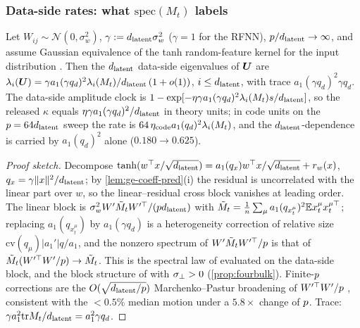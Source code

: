 \subsubsection{Data-side rates: what $\mathrm{spec}(M_t)$ labels}

\begin{proposition}[sketched]\label{prop:data-side-rates-pred}
Let $W_{ij}\sim\mathcal N(0,\sigma_w^2)$, $\gamma:=d_{\mathrm{latent}}\sigma_w^2$ ($\gamma=1$ for the RFNN), $p/d_{\mathrm{latent}}\to\infty$, and assume Gaussian equivalence of the tanh random-feature kernel for the input distribution \citep{pennington2017nonlinear,benigni2021eigenvalue,hu2022universality,goldt2022gaussian}. Then the $d_{\mathrm{latent}}$ data-side eigenvalues of $\bm{U}$ are $\lambda_i(\bm{U})=\gamma a_1(\gamma q_d)^2\lambda_i(M_t)/d_{\mathrm{latent}}\,(1+o(1))$, $i\le d_{\mathrm{latent}}$, with trace $a_1(\gamma q_d)^2\gamma q_d$. The data-side amplitude clock is $1-\exp[-\eta\gamma a_1(\gamma q_d)^2\lambda_i(M_t)s/d_{\mathrm{latent}}]$, so the released $\kappa$ equals $\eta\gamma a_1(\gamma q_d)^2/d_{\mathrm{latent}}$ in theory units; in code units on the $p=64d_{\mathrm{latent}}$ sweep the rate is $64\,\eta_{\rm code}a_1(q_d)^2\lambda_i(M_t)$, and the $d_{\mathrm{latent}}$-dependence is carried by $a_1(q_d)^2$ alone ($0.180\to0.625$).
\end{proposition}
\begin{proof}[Proof sketch]
Decompose $\tanh(w^\top x/\sqrt{d_{\mathrm{latent}}})=a_1(q_x)w^\top x/\sqrt{d_{\mathrm{latent}}}+r_w(x)$, $q_x=\gamma\|x\|^2/d_{\mathrm{latent}}$; by \cref{lem:ge-coeff-pred}(i) the residual is uncorrelated with the linear part over $w$, so the linear--residual cross block vanishes at leading order. The linear block is $\sigma_w^2W'\tilde M_tW'^\top/(pd_{\mathrm{latent}})$ with $\tilde M_t=\frac1{n}\sum_\mu a_1(q_{x_t^\mu})^2\mathbb{E} x_t^\mu x_t^{\mu\top}$; replacing $a_1(q_{x_t^\mu})$ by $a_1(\gamma q_d)$ is a heterogeneity correction of relative size $\mathrm{cv}(q_\mu)|a_1'|q/a_1$, and the nonzero spectrum of $W'\tilde M_tW'^\top/p$ is that of $\tilde M_t(W'^\top W'/p)\to\tilde M_t$. This is the spectral law of \citet{bonnaire2025} evaluated on the data-side block, and the block structure of \citet{george2025dsm} with $\sigma_{\perp}>0$ (\cref{prop:fourbulk}). Finite-$p$ corrections are the $O(\sqrt{d_{\mathrm{latent}}/p})$ Marchenko--Pastur broadening of $W'^\top W'/p$ \citep{marchenko1967distribution}, consistent with the $<0.5\%$ median motion under a $5.8\times$ change of $p$. Trace: $\gamma a_1^2\mathrm{tr}M_t/d_{\mathrm{latent}}=a_1^2\gamma q_d$.
\end{proof}

